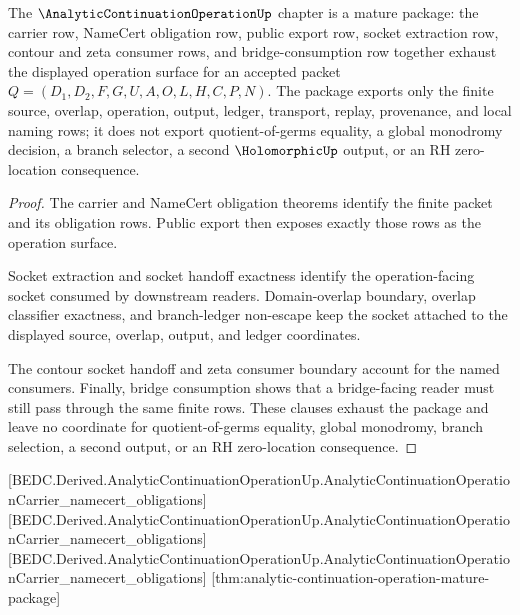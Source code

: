 \begin{theorem}
\label{thm:analytic-continuation-operation-mature-package}
The $\AnalyticContinuationOperationUp$ chapter is a mature package: the carrier row, NameCert obligation row, public export row, socket extraction row, contour and zeta consumer rows, and bridge-consumption row together exhaust the displayed operation surface for an accepted packet $Q=(D_1,D_2,F,G,U,A,O,L,H,C,P,N)$. The package exports only the finite source, overlap, operation, output, ledger, transport, replay, provenance, and local naming rows; it does not export quotient-of-germs equality, a global monodromy decision, a branch selector, a second $\HolomorphicUp$ output, or an RH zero-location consequence.
\end{theorem}
\begin{proof}
The carrier and NameCert obligation theorems identify the finite packet and its obligation rows. Public export then exposes exactly those rows as the operation surface.

Socket extraction and socket handoff exactness identify the operation-facing socket consumed by downstream readers. Domain-overlap boundary, overlap classifier exactness, and branch-ledger non-escape keep the socket attached to the displayed source, overlap, output, and ledger coordinates.

The contour socket handoff and zeta consumer boundary account for the named consumers. Finally, bridge consumption shows that a bridge-facing reader must still pass through the same finite rows. These clauses exhaust the package and leave no coordinate for quotient-of-germs equality, global monodromy, branch selection, a second output, or an RH zero-location consequence.
\end{proof}

[BEDC.Derived.AnalyticContinuationOperationUp.AnalyticContinuationOperationCarrier\_namecert\_obligations]
[BEDC.Derived.AnalyticContinuationOperationUp.AnalyticContinuationOperationCarrier\_namecert\_obligations]
[BEDC.Derived.AnalyticContinuationOperationUp.AnalyticContinuationOperationCarrier\_namecert\_obligations]
[thm:analytic-continuation-operation-mature-package]

